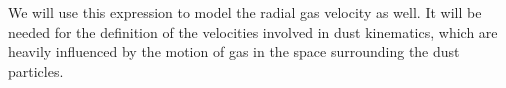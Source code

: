         We will use this expression to model the radial gas velocity as well. It will be needed for 
        the definition of the velocities involved in dust kinematics, which are heavily influenced 
        by the motion of gas in the space surrounding the dust particles.



